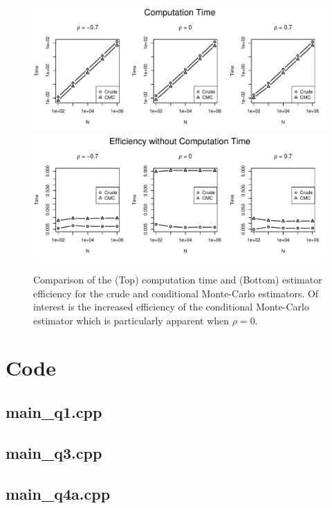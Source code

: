 \documentclass[12pt]{article}
\makeatletter
\let\oldappendix\appendix %
\renewcommand\appendix{%
    \oldappendix
    \newcommand{\section@cntformat}{\appendixname~\thesection\quad}
}
\makeatother
\begin{document}
\begin{figure}[H]
	\centering
 	\includegraphics[scale=1]{../plots/q4/heston_call_time.pdf}
 	\includegraphics[scale=1]{../plots/q4/heston_call_eff.pdf}
\caption{Comparison of the (Top) computation time and (Bottom) estimator efficiency for the crude and conditional Monte-Carlo estimators. Of interest is the increased efficiency of the conditional Monte-Carlo estimator which is particularly apparent when $\rho = 0$.}
\label{fig:heston_call_time_eff}
\end{figure}






\newpage
\appendix
\section{Code}
\subsection{main\_q1.cpp}


\subsection{main\_q3.cpp}


\subsection{main\_q4a.cpp}

\end{document}
